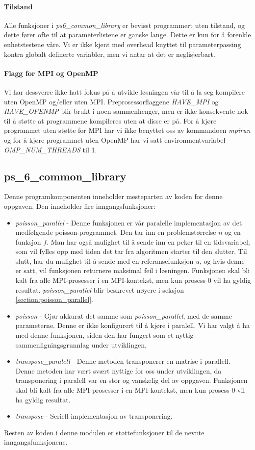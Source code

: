 \documentclass{article}
\begin{document}
\paragraph{Tilstand}
Alle funksjoner i \emph{ps6\_common\_library} er bevisst programmert uten tilstand, og dette fører ofte til at parameterlistene er ganske lange. Dette er kun for å forenkle enhetstestene våre. Vi er ikke kjent med overhead knyttet til parameterpassing kontra globalt definerte variabler, men vi antar at det er neglisjerbart.

\paragraph{Flagg for MPI og OpenMP}
Vi har dessverre ikke hatt fokus på å utvikle løsningen vår til å la seg kompilere uten OpenMP og/eller uten MPI. Preprosessorflaggene \emph{HAVE\_MPI} og \emph{HAVE\_OPENMP} blir brukt i noen sammenhenger, men er ikke konsekvente nok til å støtte at programmene kompileres uten at disse er på. For å kjøre programmet uten støtte for MPI har vi ikke benyttet oss av kommandoen \emph{mpirun} og for å kjøre programmet uten OpenMP har vi satt environmentvariabel \emph{OMP\_NUM\_THREADS} til 1.

\subsection{ps\_6\_common\_library}
Denne programkomponenten inneholder mesteparten av koden for denne oppgaven. Den inneholder fire inngangsfunksjoner:
\begin{itemize}
	\item \emph{poisson\_parallel} - Denne funksjonen er vår paralelle implementasjon av det medfølgende poisson-programmet. Den tar inn en problemstørrelse $n$ og en funksjon $f$. Man har også mulighet til å sende inn en peker til en tidsvariabel, som vil fylles opp med tiden det tar fra algoritmen starter til den slutter. Til slutt, har du mulighet til å sende med en referansefunksjon $u$, og hvis denne er satt, vil funksjonen returnere maksimal feil i løsningen. Funksjonen skal bli kalt fra alle MPI-prosesser i en MPI-kontekst, men kun prosess 0 vil ha gyldig resultat. \emph{poisson\_parallel} blir beskrevet nøyere i seksjon \ref{section:poisson_parallel}.
	\item \emph{poisson} - Gjør akkurat det samme som \emph{poisson\_parallel}, med de samme parameterne. Denne er ikke konfigurert til å kjøre i paralell. Vi har valgt å ha med denne funksjonen, siden den har fungert som et nyttig sammenligningsgrunnlag under utviklingen.
	\item \emph{transpose\_paralell} - Denne metoden transponerer en matrise i parallell. Denne metoden har vært svært nyttige for oss under utviklingen, da transponering i paralell var en stor og vanskelig del av oppgaven. Funksjonen skal bli kalt fra alle MPI-prosesser i en MPI-kontekst, men kun prosess 0 vil ha gyldig resultat.
	\item \emph{transpose} - Seriell implementasjon av transponering.
\end{itemize}
Resten av koden i denne modulen er støttefunksjoner til de nevnte inngangsfunksjonene.
\end{document}
